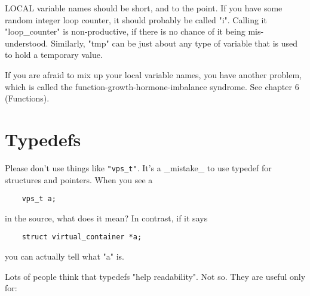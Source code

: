 \documentclass[pdftex,12pt, twocol]{article} %
\begin{document}
LOCAL variable names should be short, and to the point.  If you have
some random integer loop counter, it should probably be called "i".
Calling it "loop\_counter" is non-productive, if there is no chance of it
being mis-understood.  Similarly, "tmp" can be just about any type of
variable that is used to hold a temporary value.

If you are afraid to mix up your local variable names, you have another
problem, which is called the function-growth-hormone-imbalance syndrome.
See chapter 6 (Functions).


\section{Typedefs}

Please don't use things like \verb+"vps_t"+.
It's a \_mistake\_ to use typedef for structures and pointers. When you see a

\begin{verbatim}
	vps_t a;
\end{verbatim}

in the source, what does it mean?
In contrast, if it says

\begin{verbatim}
	struct virtual_container *a;
\end{verbatim}

you can actually tell what "a" is.

Lots of people think that typedefs "help readability". Not so. They are
useful only for:
\end{document}
